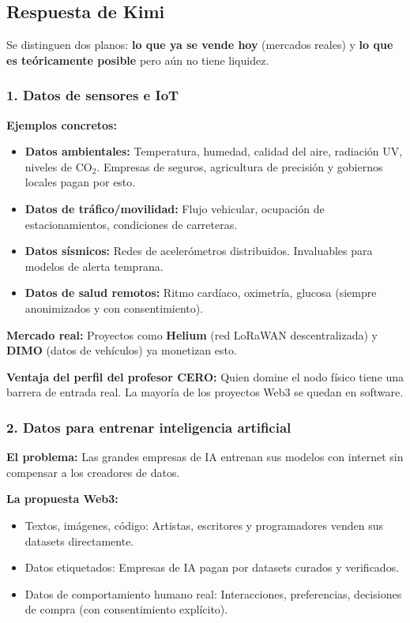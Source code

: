 \documentclass[12pt,a4paper]{article}
\begin{document}
\subsection{Respuesta de Kimi}

Se distinguen dos planos: \textbf{lo que ya se vende hoy} (mercados reales) y \textbf{lo que es te\'{o}ricamente posible} pero a\'{u}n no tiene liquidez.

\subsubsection{1. Datos de sensores e IoT}

\textbf{Ejemplos concretos:}
\begin{itemize}
    \item \textbf{Datos ambientales:} Temperatura, humedad, calidad del aire, radiaci\'{o}n UV, niveles de CO$_{2}$. Empresas de seguros, agricultura de precisi\'{o}n y gobiernos locales pagan por esto.
    \item \textbf{Datos de tr\'{a}fico/movilidad:} Flujo vehicular, ocupaci\'{o}n de estacionamientos, condiciones de carreteras.
    \item \textbf{Datos s\'{i}smicos:} Redes de aceler\'{o}metros distribuidos. Invaluables para modelos de alerta temprana.
    \item \textbf{Datos de salud remotos:} Ritmo card\'{i}aco, oximetr\'{i}a, glucosa (siempre anonimizados y con consentimiento).
\end{itemize}

\textbf{Mercado real:} Proyectos como \textbf{Helium} (red LoRaWAN descentralizada) y \textbf{DIMO} (datos de veh\'{i}culos) ya monetizan esto.

\textbf{Ventaja del perfil del profesor CERO:} Quien domine el nodo f\'{i}sico tiene una barrera de entrada real. La mayor\'{i}a de los proyectos Web3 se quedan en software.

\subsubsection{2. Datos para entrenar inteligencia artificial}

\textbf{El problema:} Las grandes empresas de IA entrenan sus modelos con internet sin compensar a los creadores de datos.

\textbf{La propuesta Web3:}
\begin{itemize}
    \item Textos, im\'{a}genes, c\'{o}digo: Artistas, escritores y programadores venden sus datasets directamente.
    \item Datos etiquetados: Empresas de IA pagan por datasets curados y verificados.
    \item Datos de comportamiento humano real: Interacciones, preferencias, decisiones de compra (con consentimiento expl\'{i}cito).
\end{itemize}
\end{document}
